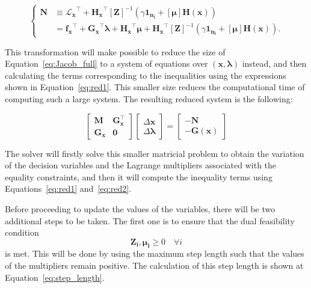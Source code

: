 \begin{equation}
    \begin{cases}
    \bm{N} &\equiv \bm{\mathcal{L}_x}^\top + \bm{H_x}^\top [\bm{Z}]^{-1} (\gamma \bm{1_{n_i}} + [\bm{\mu}] \bm{H}(\bm{x})) \\
    &= \bm{f_x}^\top + \bm{G_x}^\top \bm{\lambda} + \bm{H_x}^\top \bm{\mu} + \bm{H_x}^\top [\bm{Z}]^{-1} (\gamma \bm{1_{n_i}} + [\bm{\mu}] \bm{H}(\bm{x})).
    \end{cases}
    \label{eq:red4}
\end{equation}

This transformation will make possible to reduce the size of Equation~\eqref{eq:Jacob_full} to a system of equations over $(\bm{x}, \bm{\lambda})$ instead, and then calculating the 
terms corresponding to the inequalities using the expressions shown in Equation~\eqref{eq:red1}. This smaller size reduces the computational time of computing such a large system. 
The resulting reduced system is the following:

\begin{equation}
    \begin{bmatrix}
    \bm{M} & \bm{G}_{\bm{x}}^\top \\
    \bm{G}_{\bm{x}} & \bm{0}
    \end{bmatrix}
    \begin{bmatrix}
    \Delta \bm{x} \\
    \Delta \bm{\lambda}
    \end{bmatrix}
    =
    \begin{bmatrix}
    -\bm{N} \\
    -\bm{G}(\bm{x})
    \end{bmatrix}
    \label{eq:red5}
\end{equation}

The solver will firstly solve this smaller matricial problem to obtain the variation of the decision variables and the Lagrange multipliers associated with the equality constraints, and then
it will compute the inequality terms using Equations~\eqref{eq:red1} and~\eqref{eq:red2}.

Before proceeding to update the values of the variables, there will be two additional steps to be taken. The first one is to ensure that 
the dual feasibility condition $$\bm{Z_i}, \bm{\mu_i} \geq 0 \quad \forall i$$ is met. This will be done by using the maximum step length such that 
the values of the multipliers remain positive. The calculation of this step length is shown at Equation~\eqref{eq:step_length}.

